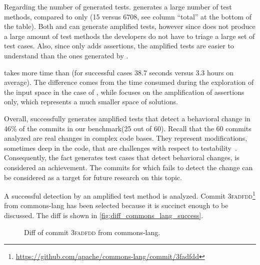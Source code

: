 Regarding the number of generated tests.
\DCII generates a large number of test methods, compared to \DCIA only (15 versus 6708, see column ``total'' at the bottom of the table). 
Both \DCIA and \DCII can generate amplified tests, however since \DCIA does not produce a large amount of test methods the developers do not have to triage a large set of test cases.
Also, since \DCIA only adds assertions, the amplified tests are easier to understand than the ones generated by \DCII.

\DCII takes more time than \DCIA (for successful cases 38.7 seconds versus 3.3 hours on average).
The difference comes from the time consumed during the exploration of the input space in the case of \DCII, while \DCIA focuses on the amplification of assertions only, which represents a much smaller space of solutions. 

Overall, \DCI successfully generates amplified tests that detect a behavioral change in 46\% of the commits in our benchmark(25 out of 60).
Recall that the 60 commits analyzed are real changes in complex code bases.
They represent modifications, sometimes deep in the code, that are challenges with respect to testability~\cite{voas1995software}.
Consequently, the fact \DCI generates test cases that detect behavioral changes, is considered an achievement.
The commits for which \DCI fails to detect the change can be considered as a target for future research on this topic.

A successful detection by an amplified test method is analyzed.
Commit \textsc{3fadfdd}\footnote{\url{https://github.com/apache/commons-lang/commit/3fadfdd}} from commons-lang has been selected because it is succinct enough to be discussed.
The diff is shown in \autoref{fig:diff_commons_lang_success}.

\begin{figure}[h]
\centering
{}
\caption{Diff of commit \textsc{3fadfdd} from commons-lang.}
\label{fig:diff_commons_lang_success}
\end{figure}

